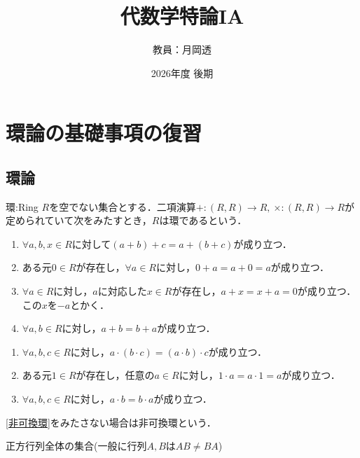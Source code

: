 \documentclass[dvipdfmx, leqno]{jsreport}
\title{代数学特論IA}
\author{教員：月岡透}
\date{2026年度 後期}
\begin{document}
\maketitle
\tableofcontents
\chapter{環論の基礎事項の復習}
\section{環論}

\begin{soudef}{環:Ring}
    $R$を空でない集合とする．二項演算$+\colon (R, R)\to R,\ \times\colon (R, R)\to R$が定められていて次をみたすとき，$R$は環であるという．
\end{soudef}
\begin{tcolorbox}[title= 和についての性質]
\begin{enumerate}[(R{1}.1)]
    \item $\forall a, b, x\in R$に対して$(a+ b)+ c= a+ (b+ c)$が成り立つ．
    \item\label{非可換環} ある元$0\in R$が存在し，$\forall a\in R$に対し，$0+ a= a+ 0= a$が成り立つ．
    \item $\forall a\in R$に対し，$a$に対応した$x\in R$が存在し，$a+ x= x+ a= 0$が成り立つ．この$x$を$-a$とかく．
    \item $\forall a, b\in R$に対し，$a+ b= b+ a$が成り立つ．
\end{enumerate}
\end{tcolorbox}

\begin{tcolorbox}[title= 積についての性質]
\begin{enumerate}[(R{2}.1)]
    \item $\forall a, b, c\in R$に対し，$a\cdot (b\cdot c)= (a\cdot b)\cdot c$が成り立つ．
    \item ある元$1\in R$が存在し，任意の$a\in R$に対し，$1\cdot a= a\cdot 1= a$が成り立つ．
    \item $\forall a, b, c\in R$に対し，$a\cdot b= b\cdot a$が成り立つ．
\end{enumerate}
\end{tcolorbox}

\begin{souremark}
    \ref{非可換環}をみたさない場合は非可換環という．
\end{souremark}

\begin{souexample}
    正方行列全体の集合(一般に行列$A, B$は$AB\ne BA$)
\end{souexample}
\end{document}
